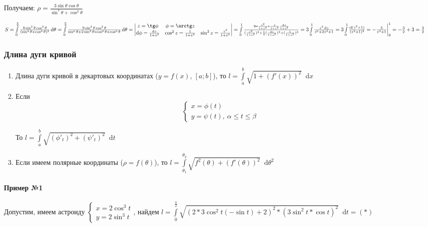 \documentclass{article}
\newcommand*\diff{\mathop{}\!\mathrm{d}}
\begin{document}
Получаем: $\rho = \frac{3 \sin \theta \cos \theta}{\sin^3 \theta + \cos^3 \theta}$

\hfill

$S = \int\limits_{0}^{\frac{\pi}{4}} \frac{9\sin^2 \theta \cos^2 \theta}{(\sin^3 \theta + \cos^3 \theta)^2} \diff \theta = \int\limits_{0}^{\frac{\pi}{4}} \frac{9\sin^2 \theta \cos^2 \theta}{\sin^6 \theta + 2 \sin^3 \theta * \cos^3 \theta + \cos^6 \theta} \diff \theta = \begin{vmatrix}
    z = \tg \phi & \phi = \arctg z \\
    \diff \phi = \frac{\diff z}{1 + z^2} & \cos^2 z = \frac{1}{1 + z^2} & \sin^2 z = \frac{z^2}{1 + z^2} 
\end{vmatrix} = \int\limits_{0}^{1} \frac{9 * \frac{z^2}{1 + z^2} * \frac{1}{1 + z^2} \frac{\diff z}{1 + z^2}}{(\frac{z^2}{1 + z^2})^3 + \frac{1}{4} (\frac{2 z}{1 + z^2})^3 + (\frac{1}{1 + z^2})^3} = 3 \int\limits_{0}^{1} \frac{z^2 \diff z}{z^6 + 2z^3 + 1} = 3 \int\limits_{0}^{1} \frac{\diff (z^3 + 1)}{(z^3 + 1)^2} = - \frac{3}{z^3 + 1} \bigg|_{0}^{1} = - \frac{3}{2} + 3 = \frac{3}{2}$

\subsubsection{Длина дуги кривой}

\begin{enumerate}
    \item Длина дуги кривой в декартовых координатах ($y = f(x)$, $[a; b]$), то $l = \int\limits_{a}^{b} \sqrt{1 + (f'(x))^2} \diff x$
    \item Если $$\begin{cases}
        x = \phi(t) \\
        y = \psi(t), \ \alpha \le t \le \beta
    \end{cases}$$

    То $l = \int\limits_{a}^{b} \sqrt{(\phi'_t)^2 + (\psi'_t)^2} \diff t$
    \item Если имеем полярные координаты ($\rho = f(\theta)$), то $l = \int\limits_{\theta_1}^{\theta_2} \sqrt{f^2(\theta) + (f'(\theta))^2} \diff \theta^2$
\end{enumerate}

\paragraph{Пример №1} Допустим, имеем астроиду $
\begin{cases}
    x = 2 \cos^3 t \\
    y = 2 \sin^3 t
\end{cases}$, найдем $l = \int\limits_{0}^{\frac{\pi}{2}} \sqrt{(2 * 3 \cos^2 t (-\sin t) + 2)^2 * (3 \sin^2 t * \cos t)^2} \diff t = (*)$
\end{document}
